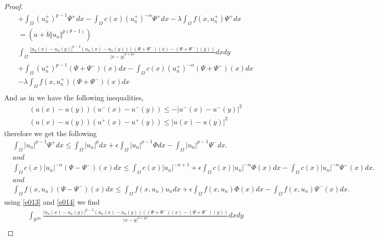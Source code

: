 \documentclass[10pt,twoside,reqno,centertags,draft]{amsart}
\begin{document}
\begin{proof}
\begin{equation}
\begin{aligned}
&+\int_{\Omega}(u_n^+)^{p-1}\Psi^{+} dx -\int_{\Omega}c(x)(u_n^+)^{-\alpha}\Psi^{+} dx -\lambda \int_{\Omega}f(x, u_n^+)\Psi^{+} dx \\
&= \left( a +b\Vert u_n\Vert^{p(\theta -1)}\right)\\
&\int_{\Omega}\frac{\vert u_n(x) -u_n(y)\vert^{p -2}(u_n(x) -u_n(y))((\Psi +\Psi^{-})(x) -(\Psi +\Psi^{-})(y))}{\vert x -y\vert^{n +ps}}dxdy \\
&+\int_{\Omega}(u_n^+)^{p-1}(\Psi +\Psi^{-})(x) dx -\int_{\Omega}c(x)(u_n^+)^{-\alpha}(\Psi +\Psi^{-})(x) dx\\
& -\lambda \int_{\Omega}f(x, u_n^+)(\Psi +\Psi^{-})(x)dx \\
\end{aligned}
\end{equation}
And as in \cite{fiscella2019nehari} we have the following inequalities,
\begin{equation}\label{e013}
\begin{aligned}
&(u(x) -u(y))(u^-(x) -u^-(y)) \leq - \vert u^-(x) -u^-(y)\vert^{2}\\
&(u(x) -u(y))(u^+(x) -u^+(y)) \leq \vert u(x) -u(y)\vert^{2}
\end{aligned}
\end{equation}
therefore we get the following 
{\scriptsize
\begin{equation}\label{e014}
\begin{aligned}
&\int_{\Omega}\vert u_n\vert^{p-1}\Psi^{+} dx 
\leq \int_{\Omega}\vert u_n\vert^{p}dx +\epsilon\int_{\Omega}\vert u_n\vert^{p-1}\Phi dx -\int_{\Omega}\vert u_n\vert^{p-1}\Psi^{-}dx.\\
& \textit{and}\\
&\int_{\Omega}c(x)\vert u_n\vert^{-\alpha}(\Psi -\Psi^{-})(x) dx \leq \int_{\Omega}c(x)\vert u_n\vert^{-\alpha +1} +\epsilon\int_{\Omega}c(x)\vert u_n\vert^{-\alpha}\Phi(x) dx -\int_{\Omega}c(x)\vert u_n\vert^{-\alpha}\Psi^{-}(x)dx.\\
& \textit{and}\\
&\int_{\Omega}f(x, u_n)(\Psi -\Psi^{-})(x)dx \leq \int_{\Omega}f(x, u_n)u_n dx + \epsilon\int_{\Omega}f(x, u_n)\Phi(x)dx -\int_{\Omega}f(x, u_n)\Psi^{-}(x)dx.
\end{aligned}
\end{equation}
}
using \ref{e013} and \ref{e014} we find
\begin{equation}\label{e015}
\begin{aligned}
&\int_{\mathbb{R}^{2n}}\frac{\vert u_n(x) -u_n(y)\vert^{p -2}(u_n(x) -u_n(y))((\Psi +\Psi^{-})(x) -(\Psi +\Psi^{-})(y))}{\vert x -y\vert^{n +ps}}dxdy\\

\end{aligned}
\end{equation}
\end{proof}
\end{document}
